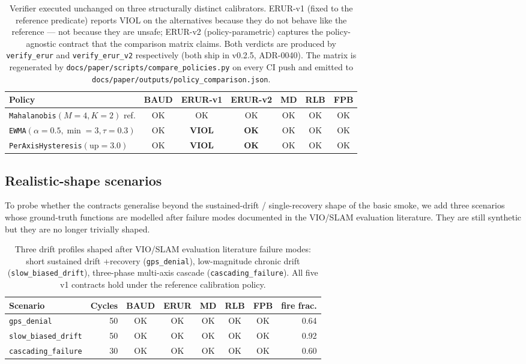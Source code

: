 \documentclass[11pt,a4paper]{article}
\begin{document}
\begin{table}[h]
\centering\small
\begin{tabular}{l c c c c c c}
\toprule
\textbf{Policy} & \textbf{BAUD} & \textbf{ERUR-v1} & \textbf{ERUR-v2} & \textbf{MD} & \textbf{RLB} & \textbf{FPB} \\
\midrule
\texttt{Mahalanobis}$(M{=}4,K{=}2)$ ref.   & OK & OK             & OK             & OK & OK & OK \\
\texttt{EWMA}$(\alpha{=}0.5,\min{=}3,\tau{=}0.3)$ & OK & \textbf{VIOL} & \textbf{OK} & OK & OK & OK \\
\texttt{PerAxisHysteresis}$(\mathrm{up}{=}3.0)$  & OK & \textbf{VIOL} & \textbf{OK} & OK & OK & OK \\
\bottomrule
\end{tabular}
\caption{Verifier executed unchanged on three structurally
distinct calibrators. ERUR-v1 (fixed to the reference predicate)
reports VIOL on the alternatives because they do not behave like
the reference --- not because they are unsafe; ERUR-v2
(policy-parametric) captures the policy-agnostic contract that
the comparison matrix claims. Both verdicts are produced by
\texttt{verify\_erur} and \texttt{verify\_erur\_v2}
respectively (both ship in v0.2.5, ADR-0040). The matrix is
regenerated by \texttt{docs/paper/scripts/compare\_policies.py}
on every CI push and emitted to
\texttt{docs/paper/outputs/policy\_comparison.json}.}
\label{tab:policy-comparison}
\end{table}

\subsection{Realistic-shape scenarios}

To probe whether the contracts generalise beyond the
sustained-drift / single-recovery shape of the basic smoke, we
add three scenarios whose ground-truth functions are modelled
after failure modes documented in the VIO/SLAM evaluation
literature. They are still synthetic but they are no longer
trivially shaped.

\begin{table}[h]
\centering\small
\begin{tabular}{l r c c c c c r}
\toprule
\textbf{Scenario} & \textbf{Cycles} & \textbf{BAUD} & \textbf{ERUR} & \textbf{MD} & \textbf{RLB} & \textbf{FPB} & \textbf{fire frac.} \\
\midrule
\texttt{gps\_denial}        & 50 & OK & OK & OK & OK & OK & 0.64 \\
\texttt{slow\_biased\_drift}& 50 & OK & OK & OK & OK & OK & 0.92 \\
\texttt{cascading\_failure} & 30 & OK & OK & OK & OK & OK & 0.60 \\
\bottomrule
\end{tabular}
\caption{Three drift profiles shaped after VIO/SLAM evaluation
literature failure modes: short sustained drift +recovery
(\texttt{gps\_denial}), low-magnitude chronic drift
(\texttt{slow\_biased\_drift}), three-phase multi-axis cascade
(\texttt{cascading\_failure}). All five v1 contracts hold under the
reference calibration policy.}
\label{tab:realistic}
\end{table}
\end{document}
